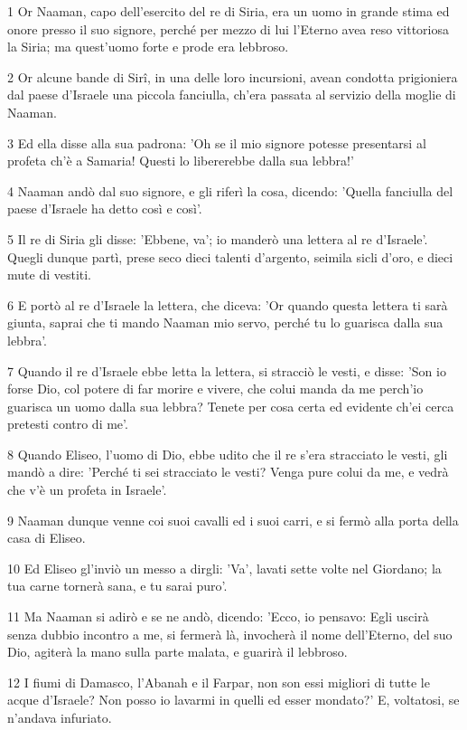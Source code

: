 \par 1 Or Naaman, capo dell'esercito del re di Siria, era un uomo in grande stima ed onore presso il suo signore, perché per mezzo di lui l'Eterno avea reso vittoriosa la Siria; ma quest'uomo forte e prode era lebbroso.
\par 2 Or alcune bande di Sirî, in una delle loro incursioni, avean condotta prigioniera dal paese d'Israele una piccola fanciulla, ch'era passata al servizio della moglie di Naaman.
\par 3 Ed ella disse alla sua padrona: 'Oh se il mio signore potesse presentarsi al profeta ch'è a Samaria! Questi lo libererebbe dalla sua lebbra!'
\par 4 Naaman andò dal suo signore, e gli riferì la cosa, dicendo: 'Quella fanciulla del paese d'Israele ha detto così e così'.
\par 5 Il re di Siria gli disse: 'Ebbene, va'; io manderò una lettera al re d'Israele'. Quegli dunque partì, prese seco dieci talenti d'argento, seimila sicli d'oro, e dieci mute di vestiti.
\par 6 E portò al re d'Israele la lettera, che diceva: 'Or quando questa lettera ti sarà giunta, saprai che ti mando Naaman mio servo, perché tu lo guarisca dalla sua lebbra'.
\par 7 Quando il re d'Israele ebbe letta la lettera, si stracciò le vesti, e disse: 'Son io forse Dio, col potere di far morire e vivere, che colui manda da me perch'io guarisca un uomo dalla sua lebbra? Tenete per cosa certa ed evidente ch'ei cerca pretesti contro di me'.
\par 8 Quando Eliseo, l'uomo di Dio, ebbe udito che il re s'era stracciato le vesti, gli mandò a dire: 'Perché ti sei stracciato le vesti? Venga pure colui da me, e vedrà che v'è un profeta in Israele'.
\par 9 Naaman dunque venne coi suoi cavalli ed i suoi carri, e si fermò alla porta della casa di Eliseo.
\par 10 Ed Eliseo gl'inviò un messo a dirgli: 'Va', lavati sette volte nel Giordano; la tua carne tornerà sana, e tu sarai puro'.
\par 11 Ma Naaman si adirò e se ne andò, dicendo: 'Ecco, io pensavo: Egli uscirà senza dubbio incontro a me, si fermerà là, invocherà il nome dell'Eterno, del suo Dio, agiterà la mano sulla parte malata, e guarirà il lebbroso.
\par 12 I fiumi di Damasco, l'Abanah e il Farpar, non son essi migliori di tutte le acque d'Israele? Non posso io lavarmi in quelli ed esser mondato?' E, voltatosi, se n'andava infuriato.
